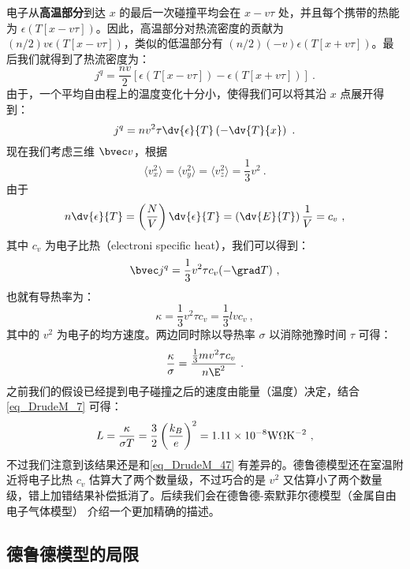 电子从\textbf{高温部分}到达 $x$ 的最后一次碰撞平均会在 $x-v\tau$ 处，并且每个携带的热能为 $\epsilon(T[x-v\tau])$。因此，高温部分对热流密度的贡献为 $(n/2)v\epsilon(T[x-v\tau])$，类似的低温部分有 $(n/2)(-v)\epsilon(T[x+v\tau])$。最后我们就得到了热流密度为：
\begin{equation}
j^q = \frac{nv}{2}[\epsilon(T[x-v\tau])-\epsilon(T[x+v\tau])]~.
\end{equation}
由于，一个平均自由程上的温度变化十分小，使得我们可以将其沿 $x$ 点展开得到：
\begin{equation}
j^q = nv^2\tau\dv{\epsilon}{T}\left(-\dv{T}{x}\right)~.
\end{equation}
现在我们考虑三维 $\bvec v$，根据
\begin{equation}
\langle v_x^2\rangle = \langle v_y^2\rangle=\langle v_z^2 \rangle = \frac{1}{3}v^2~.
\end{equation}
由于
\begin{equation}
n\dv{\epsilon}{T}=\left(\frac{N}{V}\right)\dv{\epsilon}{T}=\left(\dv{E}{T}\right)\frac{1}{V}=c_v~,
\end{equation}
其中 $c_v$ 为电子比热（electroni specific heat），我们可以得到：
\begin{equation}
\bvec j^q =\frac{1}{3}v^2\tau c_v(-\grad T)~,
\end{equation}
也就有导热率为：
\begin{equation}
\kappa=\frac{1}{3}v^2\tau c_v =\frac{1}{3}lvc_v~,
\end{equation}
其中的 $v^2$ 为电子的均方速度。两边同时除以导热率 $\sigma$ 以消除弛豫时间 $\tau$ 可得：
\begin{equation}
\frac{\kappa}{\sigma}=\frac{\frac{1}{3}mv^2\tau c_v}{n\E^2}~.
\end{equation}
之前我们的假设已经提到电子碰撞之后的速度由能量（温度）决定，结合\autoref{eq_DrudeM_7} 可得：
\begin{equation}
L=\frac{\kappa}{\sigma T}=\frac{3}{2}\left(\frac{k_B}{e}\right)^2 = 1.11\times10^{-8}\rm{W\Omega K^{-2}}~,
\end{equation}
不过我们注意到该结果还是和\autoref{eq_DrudeM_47} 有差异的。德鲁德模型还在室温附近将电子比热 $c_v$ 估算大了两个数量级，不过巧合的是 $v^2$ 又估算小了两个数量级，错上加错结果补偿抵消了。后续我们会在德鲁德-索默菲尔德模型（金属自由电子气体模型）%
介绍一个更加精确的描述。

\subsection{德鲁德模型的局限}

